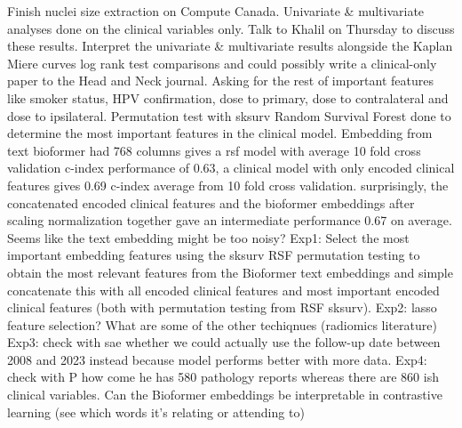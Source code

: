 \documentclass{article}%
\begin{document}
%
Finish nuclei size extraction on Compute Canada.%
\newline%
\newline%
%
%
\newline%
\newline%
%
Univariate \& multivariate analyses done on the clinical variables only. Talk to Khalil on Thursday to discuss these results. Interpret the univariate \& multivariate results alongside the Kaplan Miere curves log rank test comparisons and could possibly write a clinical{-}only paper to the Head and Neck journal. Asking for the rest of important features like smoker status, HPV confirmation, dose to primary, dose to contralateral and dose to ipsilateral. %
\newline%
\newline%
%
Permutation test with sksurv Random Survival Forest done to determine the most important features in the clinical model. %
\newline%
\newline%
%
Embedding from text bioformer had 768 columns gives a rsf model with average 10 fold cross validation c{-}index performance of 0.63, a clinical model with only encoded clinical features gives 0.69 c{-}index average from 10 fold cross validation. surprisingly, the concatenated encoded clinical features and the bioformer embeddings after scaling normalization together gave an intermediate performance 0.67 on average. Seems like the text embedding might be too noisy? %
\newline%
\newline%
%
Exp1: Select the most important embedding features using the sksurv RSF permutation testing to obtain the most relevant features from the Bioformer text embeddings and simple concatenate this with all encoded clinical features and most important encoded clinical features (both with permutation testing from RSF sksurv). %
\newline%
\newline%
%
Exp2: lasso feature selection? What are some of the other techiqnues (radiomics literature) %
\newline%
\newline%
%
Exp3: check with sae whether we could actually use the follow{-}up date between 2008 and 2023 instead because model performs better with more data. %
\newline%
\newline%
%
Exp4: check with P how come he has 580 pathology reports whereas there are 860 ish clinical variables. Can the Bioformer embeddings be interpretable in contrastive learning (see which words it’s relating or attending to) %
\end{document}
